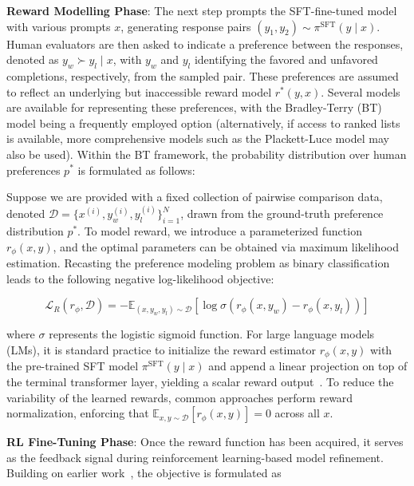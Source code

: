 \textbf{Reward Modelling Phase}: The next step prompts the SFT-fine-tuned model with various prompts $x$, generating response pairs $(y_1, y_2)\sim \pi^\text{SFT}(y \mid x)$. Human evaluators are then asked to indicate a preference between the responses, denoted as $y_w\succ y_l \mid x$, with $y_w$ and $y_l$ identifying the favored and unfavored completions, respectively, from the sampled pair. These preferences are assumed to reflect an underlying but inaccessible reward model $r^*(y, x)$. Several models are available for representing these preferences, with the Bradley-Terry (BT) model \cite{bradley1952rankanalysis} being a frequently employed option (alternatively, if access to ranked lists is available, more comprehensive models such as the Plackett-Luce model \citep{plackett1975analysis, luce2012individual} may also be used). Within the BT framework, the probability distribution over human preferences $p^*$ is formulated as follows:

Suppose we are provided with a fixed collection of pairwise comparison data, denoted $\mathcal{D}=\bigl\{x^{(i)}, y_w^{(i)}, y_l^{(i)}\bigr\}_{i=1}^N$, drawn from the ground-truth preference distribution $p^*$. To model reward, we introduce a parameterized function $r_{\phi}(x, y)$, and the optimal parameters can be obtained via maximum likelihood estimation. Recasting the preference modeling problem as binary classification leads to the following negative log-likelihood objective:

\begin{equation}\label{eq:reward_model}
    \mathcal{L}_R(r_{\phi}, \mathcal{D}) = -\mathbb{E}_{(x, y_w, y_l)\sim \mathcal{D}}\left[\log \sigma(r_{\phi}(x, y_w)- r_{\phi}(x, y_l))\right]
\end{equation}

where $\sigma$ represents the logistic sigmoid function. For large language models (LMs), it is standard practice to initialize the reward estimator $r_{\phi}(x, y)$ with the pre-trained SFT model $\pi^\text{SFT}(y \mid x)$ and append a linear projection on top of the terminal transformer layer, yielding a scalar reward output~\cite{ziegler2020finetuning}. To reduce the variability of the learned rewards, common approaches perform reward normalization, enforcing that $\mathbb{E}_{x,y\sim \mathcal{D}}\left[r_\phi(x, y)\right] = 0$ across all $x$.

\textbf{RL Fine-Tuning Phase}: Once the reward function has been acquired, it serves as the feedback signal during reinforcement learning-based model refinement. Building on earlier work~\citep{jaques2017sequence, jaques2020human}, the objective is formulated as

